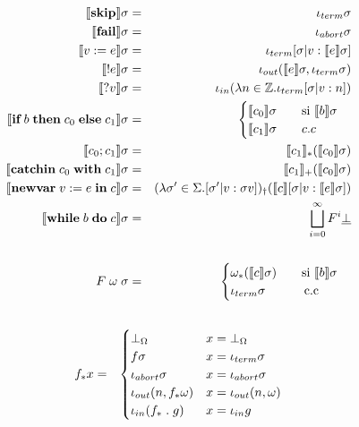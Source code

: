     \begin{multicols}{2}
      \begin{eqnarray*}
        \llbracket\textbf{skip}\rrbracket \sigma &=& \iota_{term} \sigma \\
        \llbracket\textbf{fail}\rrbracket \sigma &=& \iota_{abort} \sigma \\
        \llbracket v := e\rrbracket \sigma &=& \iota_{term} [\sigma | v : \llbracket e\rrbracket \sigma] \\
        \llbracket!e\rrbracket \sigma &=& \iota_{out}(\llbracket e\rrbracket \sigma, \iota_{term} \sigma) \\
        \llbracket?v\rrbracket \sigma &=& \iota_{in}(\lambda n \in \mathbb{Z}. \iota_{term} [\sigma | v : n]) \\
        \llbracket\textbf{if}\;b\;\textbf{then}\;c_{0}\;\textbf{else}\;c_{1}\rrbracket \sigma &=& \begin{cases}
          \llbracket c_0\rrbracket \sigma \qquad \text{si } \llbracket b\rrbracket \sigma \\
          \llbracket c_1\rrbracket \sigma \qquad c.c \\
        \end{cases}\\
        \llbracket c_{0};c_{1}\rrbracket \sigma &=& \llbracket c_1\rrbracket_{\ast} (\llbracket c_0\rrbracket \sigma) \\
        \llbracket\textbf{catchin}\;c_0\;\textbf{with}\;c_1\rrbracket \sigma &=& \llbracket c_1\rrbracket_{+} (\llbracket c_0\rrbracket \sigma) \\
        \llbracket\textbf{newvar}\; v:=e\;\textbf{in}\;c\rrbracket \sigma &=& (\lambda \sigma' \in \Sigma. [\sigma' | v:\sigma v])_{\dag} (\llbracket c\rrbracket[\sigma|v:\llbracket e\rrbracket \sigma]) \\
        \llbracket\textbf{while}\;b\;\textbf{do}\;c\rrbracket \sigma &=& \bigsqcup_{i=0}^{\infty} F^{i} \underline{\bot} \\ \\
        F \;\omega\;\sigma &=& \begin{cases}
          \omega_{\ast}(\llbracket c\rrbracket \sigma) \qquad \text{si } \llbracket b\rrbracket \sigma \\
          \iota_{term} \sigma \qquad\;\;\;\; \text{c.c}
          \end{cases}
      \end{eqnarray*}
      \begin{eqnarray*}
        \\
        f_{\ast} x &=& \begin{cases}
                        \bot_{\Omega} & x = \bot_{\Omega} \\
                        f \sigma & x = \lterm \sigma \\
                        \labort \sigma & x = \labort \sigma \\
                        \lout(n, f_{\ast} \omega) & x = \lout(n, \omega) \\ 
                        \lin(f_{\ast} \cp g) & x = \lin g 
                      \end{cases} \\ \\

\end{eqnarray*}
\end{multicols}
